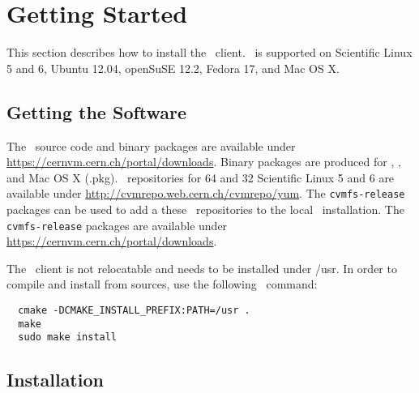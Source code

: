 \chapter{Getting Started}
\label{sct:start}

This section describes how to install the \cvmfs\ client.
\cvmfs\ is supported on Scientific Linux 5 and 6, Ubuntu 12.04, openSuSE 12.2, Fedora 17, and Mac OS X.

\section{Getting the Software}
The \cvmfs\ source code and binary packages are available under \url{https://cernvm.cern.ch/portal/downloads}.
Binary packages are produced for \rpm, \dpkg, and Mac OS X (.pkg).
\yum\ repositories for \SI{64}{\bit} and \SI{32}{\bit} Scientific Linux 5 and 6 are available under \url{http://cvmrepo.web.cern.ch/cvmrepo/yum}.
The \texttt{cvmfs-release} packages can be used to add a these \yum\ repositories to the local \yum\ installation.
The \texttt{cvmfs-release} packages are available under \url{https://cernvm.cern.ch/portal/downloads}.

The \cvmfs\ client is not relocatable and needs to be installed under /usr.
In order to compile and install from sources, use the following \cmake\ command:
\begin{verbatim}
  cmake -DCMAKE_INSTALL_PREFIX:PATH=/usr .
  make
  sudo make install
\end{verbatim}

\section{Installation}

